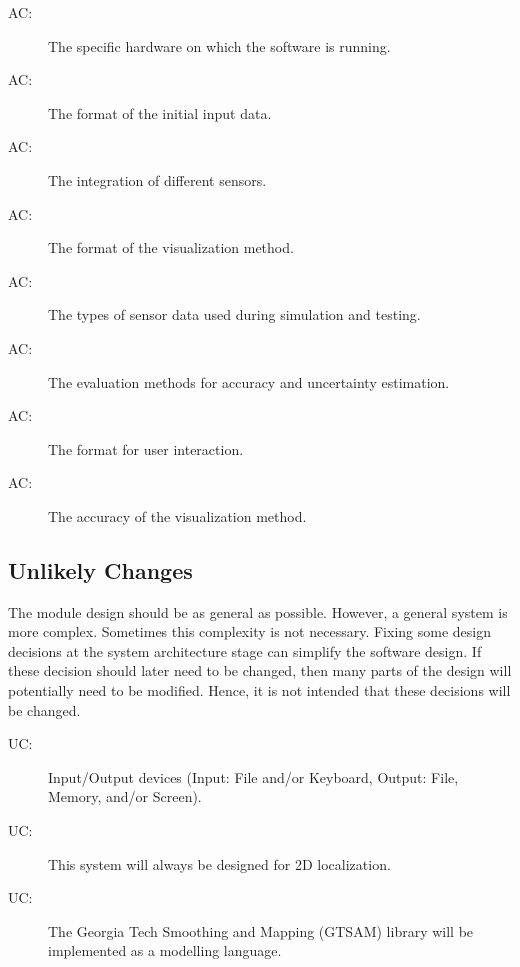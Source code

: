 \documentclass[12pt, titlepage]{article}
\newcounter{acnum}
\newcommand{\actheacnum}{AC\theacnum}
\newcounter{ucnum}
\newcommand{\uctheucnum}{UC\theucnum}
\begin{document}
\begin{description}
\item[ \actheacnum \label{acHardware}:] The specific hardware on which the software is running.
\item[ \actheacnum \label{acInput}:] The format of the initial input data.
\item[ \actheacnum \label{acLocalize}:] The integration of different sensors.

\item[ \actheacnum \label{acOutput}:] The format of the visualization method.

\item[ \actheacnum \label{acSF}:] The types of sensor data used during simulation and testing.

\item[ \actheacnum \label{acAccurate}:] The evaluation methods for accuracy and uncertainty estimation.

\item[ \actheacnum \label{acControl}:] The format for user interaction.

\item[ \actheacnum \label{acPlot}:] The accuracy of the visualization method.

\end{description}


\subsection{Unlikely Changes} \label{SecUchange}

The module design should be as general as possible. However, a general system is
more complex. Sometimes this complexity is not necessary. Fixing some design
decisions at the system architecture stage can simplify the software design. If
these decision should later need to be changed, then many parts of the design
will potentially need to be modified. Hence, it is not intended that these
decisions will be changed.

\begin{description}
\item[ \uctheucnum \label{ucIO}:] Input/Output devices
  (Input: File and/or Keyboard, Output: File, Memory, and/or Screen).
\item[ \uctheucnum \label{uc2D}:] This system will always be designed for 2D localization.
\item[ \uctheucnum \label{ucGTSAM}:] The Georgia Tech Smoothing and Mapping (GTSAM) library will be implemented as a modelling language.
\end{description}
\end{document}
